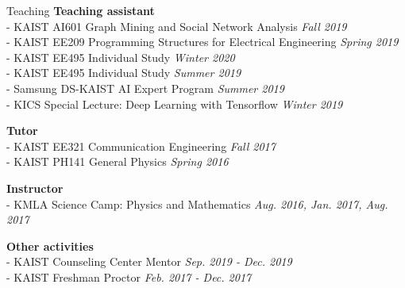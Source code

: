 \documentclass{resume} %
\begin{document}
\begin{rSection}{Teaching}
{\bf Teaching assistant} 
\\ - KAIST AI601 Graph Mining and Social Network Analysis \hfill \textit{Fall 2019}
\\ - KAIST EE209 Programming Structures for Electrical Engineering \hfill \textit{Spring 2019}
\\ - KAIST EE495 Individual Study \hfill \textit{Winter 2020}
\\ - KAIST EE495 Individual Study \hfill \textit{Summer 2019}
\\ - Samsung DS-KAIST AI Expert Program \hfill {\em Summer 2019}
\\ - KICS Special Lecture: Deep Learning with Tensorflow \hfill \textit{Winter 2019}

{\bf Tutor} 
\\ - KAIST EE321 Communication Engineering \hfill \textit{Fall 2017}
\\ - KAIST PH141 General Physics \hfill \textit{Spring 2016}

{\bf Instructor}
\\ - KMLA Science Camp: Physics and Mathematics  \hfill \textit{Aug. 2016, Jan. 2017, Aug. 2017}

{\bf Other activities}
\\ - KAIST Counseling Center Mentor  \hfill \textit{Sep. 2019 - Dec. 2019}
\\ - KAIST Freshman Proctor \hfill \textit{Feb. 2017 - Dec. 2017}

\end{rSection}
\end{document}
